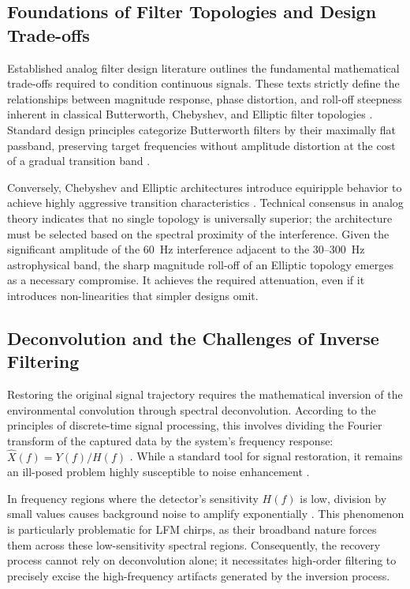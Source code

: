 \subsection{Foundations of Filter Topologies and Design Trade-offs}
Established analog filter design literature outlines the fundamental mathematical trade-offs required to condition continuous signals. These texts strictly define the relationships between magnitude response, phase distortion, and roll-off steepness inherent in classical Butterworth, Chebyshev, and Elliptic filter topologies \cite{3}. Standard design principles categorize Butterworth filters by their maximally flat passband, preserving target frequencies without amplitude distortion at the cost of a gradual transition band \cite{9}.

Conversely, Chebyshev and Elliptic architectures introduce equiripple behavior to achieve highly aggressive transition characteristics \cite{3, 9}. Technical consensus in analog theory indicates that no single topology is universally superior; the architecture must be selected based on the spectral proximity of the interference. Given the significant amplitude of the 60~Hz interference adjacent to the 30--300~Hz astrophysical band, the sharp magnitude roll-off of an Elliptic topology emerges as a necessary compromise. It achieves the required attenuation, even if it introduces non-linearities that simpler designs omit.

\subsection{Deconvolution and the Challenges of Inverse Filtering}
Restoring the original signal trajectory requires the mathematical inversion of the environmental convolution through spectral deconvolution. According to the principles of discrete-time signal processing, this involves dividing the Fourier transform of the captured data by the system’s frequency response: $\hat{X}(f) = Y(f)/H(f)$ \cite{4}. While a standard tool for signal restoration, it remains an ill-posed problem highly susceptible to noise enhancement \cite{4}.

In frequency regions where the detector's sensitivity $H(f)$ is low, division by small values causes background noise to amplify exponentially \cite{4, 5}. This phenomenon is particularly problematic for LFM chirps, as their broadband nature forces them across these low-sensitivity spectral regions. Consequently, the recovery process cannot rely on deconvolution alone; it necessitates high-order filtering to precisely excise the high-frequency artifacts generated by the inversion process.

